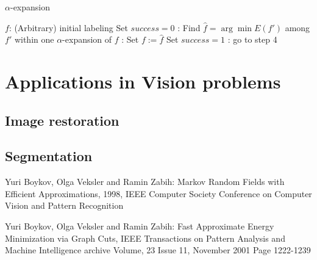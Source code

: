 \documentclass{scrartcl}[12pt, halfparskip]
\begin{document}
\begin{algorithm}[H]
\caption{$\alpha$-expansion}\label{alg:alpha-expansion}
\begin{algorithmic}[1]
	\State $f$: (Arbitrary) initial labeling 
	\State
	\State Set $success = 0$
	:
		\State Find $\hat{f} = \arg \min E(f')$ among $f'$ within one $\alpha$-expansion of $f$
		:
			\State Set $f := \hat{f}$
			\State Set $success = 1$
		\EndIf
	\EndFor
	:
		\State go to step 4
	\EndIf
	\State
	\State {}
\EndProcedure
\end{algorithmic}
\end{algorithm}


\section{Applications in Vision problems}
\subsection{Image restoration}
\subsection{Segmentation}




\begin{thebibliography}{9}

  Yuri Boykov, Olga Veksler and Ramin Zabih:
  Markov Random Fields with Efficient Approximations,
  1998,
  IEEE Computer Society Conference on Computer Vision and
  Pattern Recognition
  
  Yuri Boykov, Olga Veksler and Ramin Zabih:
  Fast Approximate Energy Minimization via Graph
  Cuts,
  IEEE Transactions on Pattern Analysis and Machine Intelligence archive Volume,
  23 Issue 11, November 2001 Page 1222-1239
  

  

\end{thebibliography}
\end{document}
